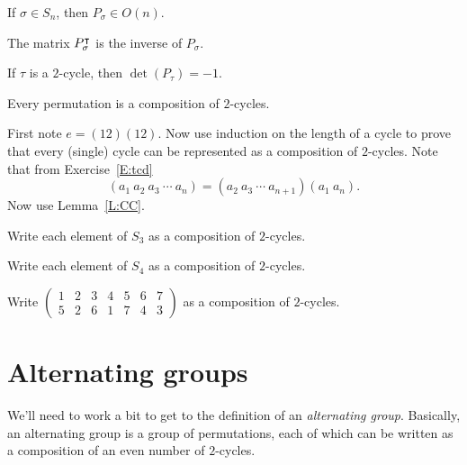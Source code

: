 \documentclass{ximera}
\begin{document}
\begin{lemma}
  If $\sigma \in S_n$, then $P_\sigma \in O(n)$.
  \begin{sketch}
    The matrix $P_\sigma^\intercal$ is the inverse of $P_\sigma$.
  \end{sketch}
\end{lemma}

\begin{corollary}
  If $\tau$ is a $2$-cycle, then $\det(P_\tau) = -1$.
\end{corollary}





\begin{lemma}\label{L:td}
  Every permutation is a composition of $2$-cycles.
  \begin{sketch}
    First note $e = (12)(12)$. Now use induction on the length of a
    cycle to prove that every (single) cycle can be represented as a
    composition of $2$-cycles. Note that from Exercise~\ref{E:tcd}
    \[
    (a_1 \ a_2 \ a_3 \ \cdots \ a_{n}) = (a_2 \ a_3 \ \cdots \ a_{n+1}) (a_1 \ a_{n}). 
    \]
    Now use Lemma~\ref{L:CC}.
  \end{sketch}
\end{lemma}


\begin{exercise}
  Write each element of $S_3$ as a composition of $2$-cycles.
\end{exercise}

\begin{exercise}
  Write each element of $S_4$ as a composition of $2$-cycles.
\end{exercise}

\begin{exercise}
  Write $\left(\begin{smallmatrix}
    1 & 2 & 3 & 4 & 5 & 6 & 7 \\
    5 & 2 & 6 & 1 & 7 & 4 & 3
  \end{smallmatrix}\right)$ as a composition of $2$-cycles.
\end{exercise}



\section{Alternating groups}


We'll need to work a bit to get to the definition of an
\textit{alternating group}. Basically, an alternating group is a group
of permutations, each of which can be written as a composition of an
even number of $2$-cycles.
\end{document}
